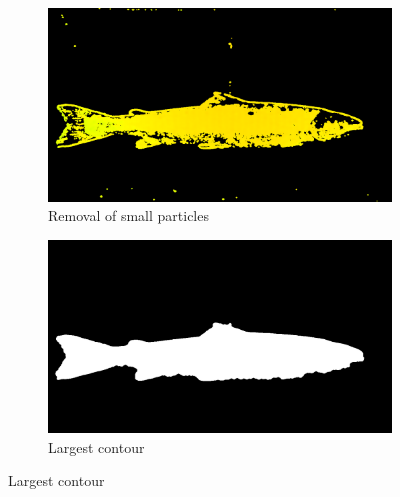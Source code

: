 \begin{figure}[H]
    \medskip
    \begin{subfigure}{0.49\textwidth}
        \includegraphics[width=\linewidth]{images/implementation/3_remove_particles}
        \caption{Removal of small particles} 
        \label{fig:remove_particles}
    \end{subfigure}\hspace*{\fill}
    \begin{subfigure}{0.49\textwidth}
        \includegraphics[width=\linewidth]{images/implementation/4_largest_contour}
        \caption{Largest contour} 
        \label{fig:largest_contour}
    \end{subfigure}
    

\end{figure}
